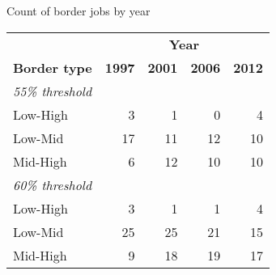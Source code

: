 \begin{center}
\begin{threeparttable}[!h]
\caption{Count of border jobs by year}
\begin{tabular}{lrrrr}
\toprule
&\multicolumn{4}{c}{\textbf{Year}} \\
\textbf{Border type}&\multicolumn{1}{c}{\textbf{1997}}&\multicolumn{1}{c}{\textbf{2001}}&\multicolumn{1}{c}{\textbf{2006}}&\multicolumn{1}{c}{\textbf{2012}}\\
\midrule
\textit{55\% threshold}\\
\hspace{3mm}Low-High            &           3&           1&    0  &     4\\
\hspace{3mm}Low-Mid             &          17&          11&          12&          10\\
\hspace{3mm}Mid-High            &           6&          12&          10&          10\vspace{3mm}\\
\textit{60\% threshold}\\
\hspace{3mm}Low-High            &           3&           1&           1&           4\\
\hspace{3mm}Low-Mid             &          25&          25&          21&          15\\
\hspace{3mm}Mid-High            &           9&          18&          19&          17\\
\bottomrule
\bottomrule
\end{tabular}
\end{threeparttable}
\end{center}
